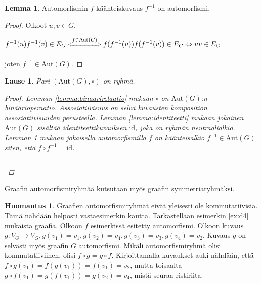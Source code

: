 \documentclass[a4paper, 12pt]{article}
\theoremstyle{definition}
\newtheorem{huom}{Huomautus}
\newtheorem{lemma}{Lemma}
\theoremstyle{plain}
\newtheorem{teor}[mydef]{Lause}
\begin{document}
\begin{lemma}
\label{lemma:kaanteiskuvaus}
Automorfismin $f$ käänteiskuvaus $f^{-1}$ on automorfismi.
\begin{proof}
Olkoot $u, v \in G$.
\begin{center}
\begin{math}
f^{-1}(u)f^{-1}(v) \in E_G \xLeftrightarrow{f \in \mathrm{Aut}(G)} f(f^{-1}(u))f(f^{-1}(v)) \in E_G \Leftrightarrow uv \in E_G
\end{math}
\end{center}
joten $f^{-1} \in \mathrm{Aut}(G)$.
\end{proof}
\end{lemma}

\begin{teor}
Pari $(\mathrm{Aut}(G), \circ)$ on ryhmä.
\begin{proof}
Lemman \ref{lemma:binaarirelaatio} mukaan $\circ$ on $\mathrm{Aut}(G)$:n binäärioperaatio. Assosiatiivisuus on selvä kuvausten komposition assosiatiivisuuden perusteella. Lemman \ref{lemma:identiteetti} mukaan jokainen $\mathrm{Aut}(G)$ sisältää identiteettikuvauksen $\mathrm{id}$, joka on ryhmän neutraalialkio. Lemman \ref{lemma:kaanteiskuvaus} mukaan jokaisella automorfismilla $f$ on käänteisalkio $f^{-1} \in \mathrm{Aut}(G)$ siten, että $f \circ f^{-1} = \mathrm{id}$.
\begin{center}
\begin{math}
\end{math}
\end{center}
\end{proof}
\end{teor}

Graafin automorfismiryhmää kutsutaan myös graafin symmetriaryhmäksi.

\begin{huom}
Graafien automorfismiryhmät eivät yleisesti ole kommutatiivisia.\\
Tämä nähdään helposti vastaesimerkin kautta. Tarkastellaan esimerkin \ref{ex:d4} mukaista graafia. Olkoon $f$ esimerkissä esitetty automorfismi. Olkoon kuvaus $g: V_G \rightarrow V_G, g(v_1) = v_1, g(v_2) = v_4, g(v_3) = v_3, g(v_4) = v_2$. Kuvaus $g$ on selvästi myös graafin $G$ automorfismi. Mikäli automorfismiryhmä olisi kommutatiiviinen, olisi $f \circ g = g \circ f$. Kirjoittamalla kuvaukset auki nähdään, että $f \circ g(v_1) = f(g(v_1)) = f(v_1) = v_2$, mutta toisaalta $g \circ f (v_1) = g(f(v_1)) = g(v_2) = v_4$, mistä seuraa ristiriita.
\end{huom}
\end{document}

